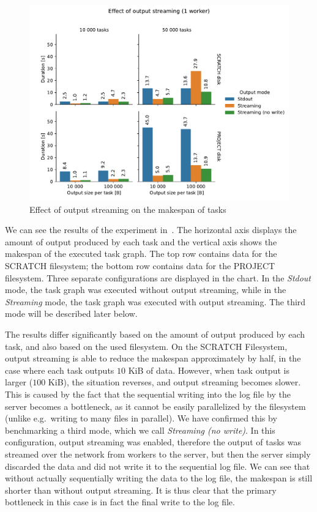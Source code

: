 \begin{figure}[h]
	\centering
	\includegraphics[width=\textwidth]{imgs/hq/charts/io-streaming}
	\caption{Effect of output streaming on the makespan of tasks}
	\label{fig:hq-io-streaming}
\end{figure}

We can see the results of the experiment in~. The horizontal axis displays
the amount of output produced by each task and the vertical axis shows the makespan of the executed
task graph. The top row contains data for the SCRATCH filesystem; the bottom row contains data for
the PROJECT filesystem. Three separate configurations are displayed in the chart. In the
\emph{Stdout} mode, the task graph was executed without output streaming, while in the
\emph{Streaming} mode, the task graph was executed with output streaming. The third mode
will be described later below.

The results differ significantly based on the amount of output produced by each task, and also
based on the used filesystem. On the SCRATCH Filesystem, output streaming is able to reduce the
makespan approximately by half, in the case where each task outputs $10$ KiB of
data. However, when task output is larger ($100$ KiB), the situation reverses,
and output streaming becomes slower. This is caused by the fact that the sequential writing into
the log file by the server becomes a bottleneck, as it cannot be easily parallelized by the
filesystem (unlike e.g.\ writing to many files in parallel). We have confirmed this by benchmarking
a third mode, which we call \emph{Streaming (no write)}. In this configuration, output streaming was
enabled, therefore the output of tasks was streamed over the network from workers to the server,
but then the server simply discarded the data and did not write it to the sequential log file. We
can see that without actually sequentially writing the data to the log file, the makespan is still
shorter than without output streaming. It is thus clear that the primary bottleneck in this case is
in fact the final write to the log file.

